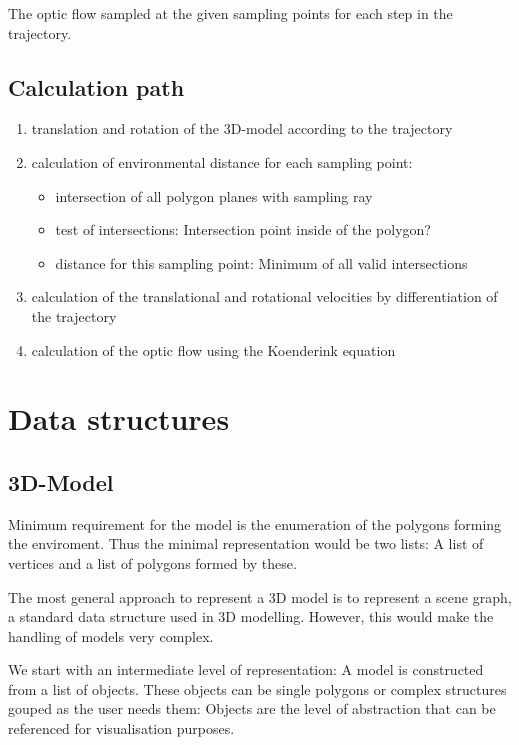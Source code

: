 \documentclass[a4paper]{article}
\begin{document}
The optic flow sampled at the given sampling points for each step in
the trajectory.

\subsection{Calculation path}

\begin{enumerate}
\item translation and rotation of the 3D-model according to the
  trajectory

\item calculation of environmental distance for each sampling point:
  \begin{itemize}
  \item intersection of all polygon planes with sampling ray
  \item test of intersections: Intersection point inside of the
    polygon?
  \item distance for this sampling point: Minimum of all valid
    intersections
  \end{itemize}

\item calculation of the translational and rotational velocities by
  differentiation of the trajectory

\item calculation of the optic flow using the Koenderink equation
\end{enumerate}

\section{Data structures}

\subsection{3D-Model}

Minimum requirement for the model is the enumeration of the polygons
forming the enviroment. Thus the minimal representation would be two
lists: A list of vertices and a list of polygons formed by these.

The most general approach to represent a 3D model is to represent a
scene graph, a standard data structure used in 3D modelling. However,
this would make the handling of models very complex.

We start with an intermediate level of representation: A model is
constructed from a list of objects. These objects can be single
polygons or complex structures gouped as the user needs them: Objects
are the level of abstraction that can be referenced for visualisation
purposes. 
\end{document}
